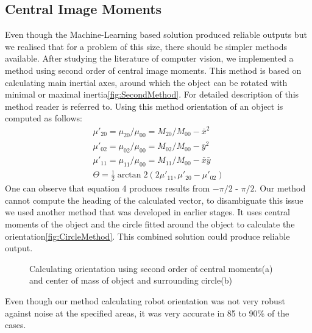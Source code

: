 \subsection{Central Image Moments}
Even though the Machine-Learning based solution produced reliable outputs but we realised that for a problem of this size, there should be simpler methods available. After studying the literature of computer vision, we implemented a method using second order of central image moments. This method is based on calculating main inertial axes, around which the object can be rotated with minimal or maximal inertia\ref{fig:SecondMethod}. For detailed description of this method reader is referred to\cite{Teague:80}. Using this method orientation of an object is computed as follows:
\begin{align}
\label{equ:centroid}
\mu'_{20} = \mu_{20} / \mu_{00} = M_{20}/M_{00} - \bar{x}^2 \\
\mu'_{02} = \mu_{02} / \mu_{00} = M_{02}/M_{00} - \bar{y}^2 \\
\mu'_{11} = \mu_{11} / \mu_{00} = M_{11}/M_{00} - \bar{x}\bar{y} \\
\Theta = \frac{1}{2} \arctan2 \left( {2\mu'_{11}},{\mu'_{20} - \mu'_{02}} \right) \label{orientationEq}
\end{align}
One can observe that equation 4 produces results from $-\pi/2$ - $\pi/2$. Our method cannot compute the heading of the calculated vector, to disambiguate this issue we used another method that was developed in earlier stages. It uses central moments of the object and the circle fitted around the object to calculate the orientation\ref{fig:CircleMethod}. This combined solution could produce reliable output. 
\begin{figure}[htp]
\begin{center}
\leavevmode
{}
\end{center}
\caption{Calculating orientation using second order of central moments(a) and center of mass of object and surrounding circle(b)}
\end{figure} 
Even though our method calculating robot orientation was not very robust against noise at the specified areas, it was very accurate in 85 to 90\% of the cases. 
